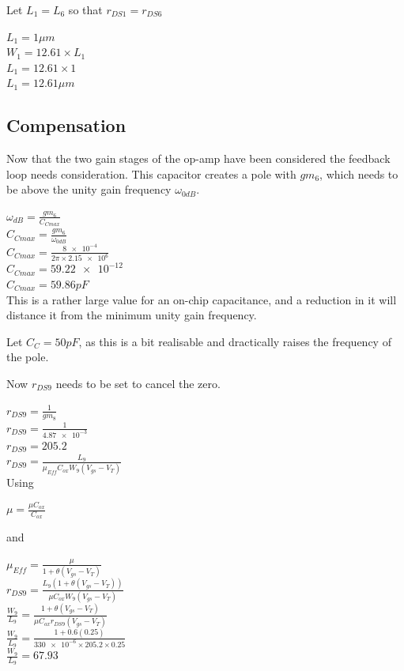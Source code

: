 Let $L_{1} = L_{6}$ so that $r_{DS1} = r_{DS6}$ 

$L_{1} = 1\mu m$ \\
$W_{1} = 12.61 \times L_{1}$ \\
$L_{1} = 12.61 \times 1$ \\
$L_{1} = 12.61\mu m$ \\

\subsection{Compensation}

Now that the two gain stages of the op-amp have been considered the feedback loop needs consideration.
This capacitor creates a pole with $gm_{6}$, which needs to be above the unity gain frequency $\omega_{0dB}$.

$\omega_{dB} = \frac{gm_{6}}{C_{Cmax}}$ \\
$C_{Cmax} = \frac{gm_{6}}{\omega_{0dB}}$ \\
$C_{Cmax} = \frac{\num{8e-4}}{2\pi \times \num{2.15e6}}$ \\
$C_{Cmax} = \num{59.22e-12}$ \\
$C_{Cmax} = 59.86pF$ \\

This is a rather large value for an on-chip capacitance, and a reduction in it will distance it from the minimum unity gain frequency.

Let $C_{C} = 50pF$, as this is a bit realisable and dractically raises the frequency of the pole.

Now $r_{DS9}$ needs to be set to cancel the zero.

$r_{DS9} = \frac{1}{gm_{8}}$ \\
$r_{DS9} = \frac{1}{\num{4.87e-3}}$ \\
$r_{DS9} = 205.2$ \\

$r_{DS9} = \frac{L_{9}}{\mu_{Eff}C_{ox}W_{9}(V_{gs} - V_{T})}$ \\

Using

$\mu = \frac{\mu C_{ox}}{C_{ox}}$

and

$\mu_{Eff} = \frac{\mu}{1 + \theta (V_{gs} - V_{T})}$ \\

$r_{DS9} = \frac{L_{9}(1 + \theta (V_{gs} - V_{T}))}{\mu C_{ox}W_{9}(V_{gs} - V_{T})}$ \\
$\frac{W_{9}}{L_{9}} = \frac{1 + \theta (V_{gs} - V_{T})}{\mu C_{ox}r_{DS9}(V_{gs} - V_{T})}$ \\
$\frac{W_{9}}{L_{9}} = \frac{1 + 0.6(0.25)}{\num{330e-6} \times 205.2 \times 0.25}$ \\
$\frac{W_{9}}{L_{9}} = 67.93$ \\

